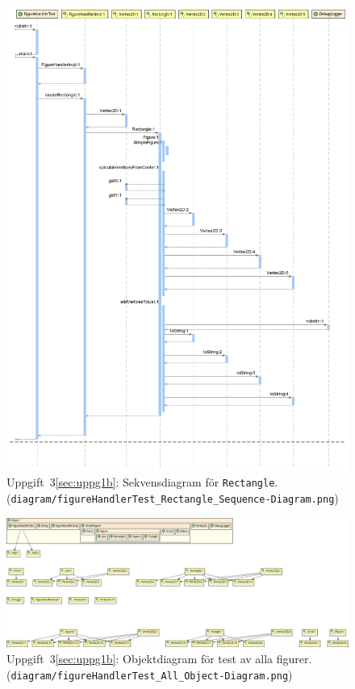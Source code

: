 \begin{figure}[ht]
\centering
\includegraphics[width=\linewidth]{diagram/figureHandlerTest_Rectangle_Sequence-Diagram.png}
\caption{Uppgift~3\ref{sec:uppg1b}: Sekvensdiagram för \texttt{Rectangle}.
\\ (\texttt{diagram/figureHandlerTest\_Rectangle\_Sequence-Diagram.png})}
\label{fig:sekv-rect}
\end{figure}

\begin{figure}
\centering
\includegraphics[width=\linewidth]{diagram/figureHandlerTest_All_Object-Diagram.png}
\caption{Uppgift~3\ref{sec:uppg1b}: Objektdiagram för test av alla figurer.
\\ (\texttt{diagram/figureHandlerTest\_All\_Object-Diagram.png})}
\label{fig:obj-all}
\end{figure}

